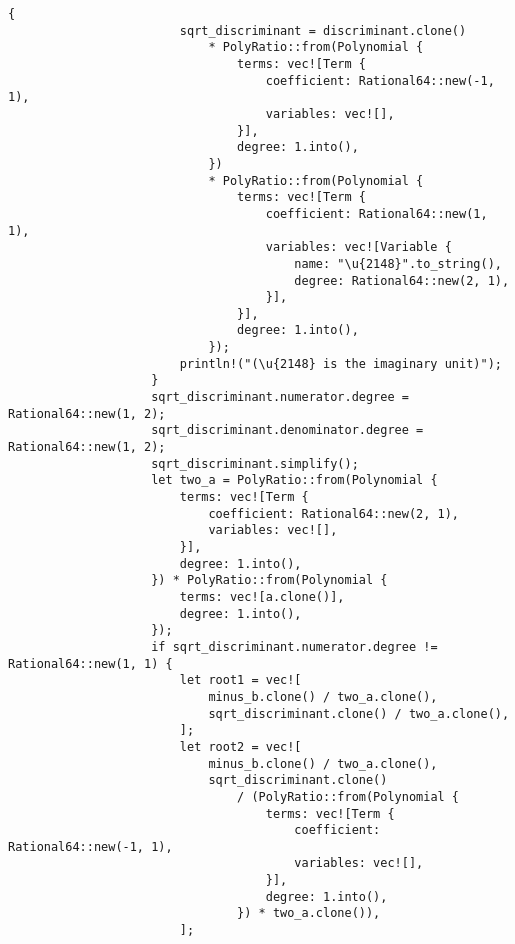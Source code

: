 \begin{lstlisting}[caption={The implementation of the \texttt{roots()} method for the \texttt{Polynomial} struct}, label={lst:polynomial-roots}]
                    {
                        sqrt_discriminant = discriminant.clone()
                            * PolyRatio::from(Polynomial {
                                terms: vec![Term {
                                    coefficient: Rational64::new(-1, 1),
                                    variables: vec![],
                                }],
                                degree: 1.into(),
                            })
                            * PolyRatio::from(Polynomial {
                                terms: vec![Term {
                                    coefficient: Rational64::new(1, 1),
                                    variables: vec![Variable {
                                        name: "\u{2148}".to_string(),
                                        degree: Rational64::new(2, 1),
                                    }],
                                }],
                                degree: 1.into(),
                            });
                        println!("(\u{2148} is the imaginary unit)");
                    }
                    sqrt_discriminant.numerator.degree = Rational64::new(1, 2);
                    sqrt_discriminant.denominator.degree = Rational64::new(1, 2);
                    sqrt_discriminant.simplify();
                    let two_a = PolyRatio::from(Polynomial {
                        terms: vec![Term {
                            coefficient: Rational64::new(2, 1),
                            variables: vec![],
                        }],
                        degree: 1.into(),
                    }) * PolyRatio::from(Polynomial {
                        terms: vec![a.clone()],
                        degree: 1.into(),
                    });
                    if sqrt_discriminant.numerator.degree != Rational64::new(1, 1) {
                        let root1 = vec![
                            minus_b.clone() / two_a.clone(),
                            sqrt_discriminant.clone() / two_a.clone(),
                        ];
                        let root2 = vec![
                            minus_b.clone() / two_a.clone(),
                            sqrt_discriminant.clone()
                                / (PolyRatio::from(Polynomial {
                                    terms: vec![Term {
                                        coefficient: Rational64::new(-1, 1),
                                        variables: vec![],
                                    }],
                                    degree: 1.into(),
                                }) * two_a.clone()),
                        ];

\end{lstlisting}
